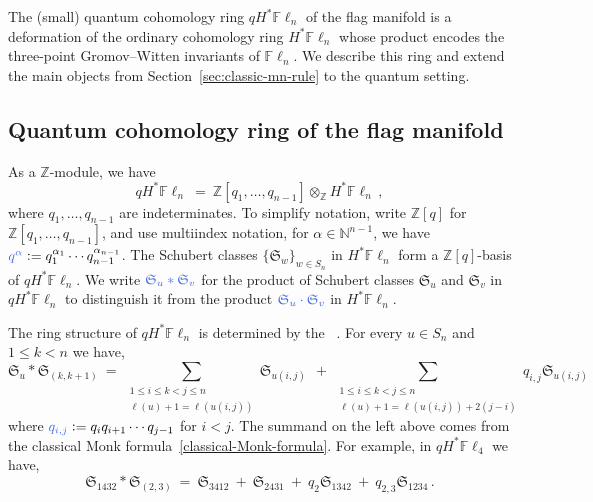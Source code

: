 \documentclass[12pt,oneside,reqno]{amsart}
\theoremstyle{definition}
\numberwithin{equation}{section}
\newcommand{\Fl}{{\mathbb F}\ell}
\newcommand{\Fln}{{\mathbb F}\ell_n}
\newcommand{\NN}{{\mathbb N}}
\newcommand{\ZZ}{{\mathbb Z}}
\newcommand{\frakS}{{\mathfrak S}}
\newcommand{\defcolor}[1]{{\color{RoyalBlue}#1}}
\newcommand{\demph}[1]{\defcolor{{\sl #1}}}
\begin{document}
The (small) quantum cohomology ring \defcolor{$qH^*\Fln$} of the flag manifold
is a deformation of the ordinary cohomology ring $H^*\Fln$ whose product encodes the three-point
Gromov--Witten invariants of $\Fln$.
We describe this ring and extend the main
objects from Section~\ref{sec:classic-mn-rule} to the quantum setting.

\subsection{Quantum cohomology ring of the flag manifold}
As a $\ZZ$-module, we have
%
 \begin{equation*}
    qH^*\Fln\ =\  \ZZ[q_1,\dotsc,q_{n-1}] \otimes_\ZZ H^*\Fln\,,
 \end{equation*}
%
where $q_1,\dotsc,q_{n-1}$ are indeterminates.
To simplify notation, write \defcolor{$\ZZ[q]$} for $\ZZ[q_1,\dotsc,q_{n-1}]$, and use multiindex notation, for
$\alpha\in\NN^{n-1}$, we have $\defcolor{q^\alpha}\vcentcolon= q_1^{\alpha_1}\dotsb q_{n-1}^{\alpha_{n-1}}$.
The Schubert classes $\{\frakS_w\}_{w \in S_n}$ in $H^*\Fln$
form a $\ZZ[q]$-basis of $qH^*\Fln$.
We write $\defcolor{\frakS_u \ast \frakS_v}$ for the product of Schubert
classes $\frakS_u$ and $\frakS_v$ in $qH^*\Fln$ to distinguish it from
the product $\defcolor{\frakS_u \cdot \frakS_v}$  in $H^*\Fln$.

The ring structure of $qH^*\Fln$ is determined by the \demph{quantum Monk formula}~\cite{FGP}.
For every $u\in S_n$ and $1\leq k<n$ we have,
\begin{equation}
    \label{quantum-Monk-formula}
    \frakS_u * \frakS_{(k,k+1)}
    \ =\ 
    \sum_{\substack{1 \leq i \leq k < j \leq n \\ \ell(u) + 1 = \ell(u(i,j))}} \frakS_{u (i,j)}\ 
    \ +\ 
    \sum_{\substack{1 \leq i \leq k < j \leq n \\ \ell(u) + 1 = \ell(u(i,j)) + 2(j - i)}} q_{i,j} \frakS_{u (i,j)}
\end{equation}
where $\defcolor{q_{i,j}}\vcentcolon=q_iq_{i+1}\dotsb q_{j-1}$ for $i < j$.
The summand on the left above comes from the classical Monk
formula~\eqref{classical-Monk-formula}.
For example, in $qH^*\Fl_4$ we have,
%
 \begin{equation}
   \label{Eq:q-Monk}
    \frakS_{1432} * \frakS_{(2,3)}
    \ =\  \frakS_{3412} \ +\ \frakS_{2431}
    \ +\ q_{2}\frakS_{1342} \ +\  q_{2,3} \frakS_{1234}\,.
 \end{equation}
%
\end{document}
